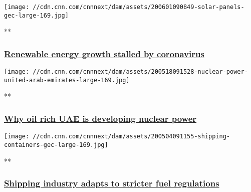 \href{/videos/business/2020/06/01/renewable-energy-solar-wind-coronavirus-gec.cnn-business/video/playlists/business-global-energy-challenge/}{}

\texttt{[image: //cdn.cnn.com/cnnnext/dam/assets/200601090849-solar-panels-gec-large-169.jpg]}

**

\hypertarget{renewable-energy-growth-stalled-by-coronavirus}{%
\subsubsection{\texorpdfstring{\href{/videos/business/2020/06/01/renewable-energy-solar-wind-coronavirus-gec.cnn-business/video/playlists/business-global-energy-challenge/}{Renewable
energy growth stalled by
coronavirus}}{Renewable energy growth stalled by coronavirus}}\label{renewable-energy-growth-stalled-by-coronavirus}}

\href{/videos/business/2020/05/18/nuclear-power-energy-united-arab-emirates.cnn-business/video/playlists/business-global-energy-challenge/}{}

\texttt{[image: //cdn.cnn.com/cnnnext/dam/assets/200518091528-nuclear-power-united-arab-emirates-large-169.jpg]}

**

\hypertarget{why-oil-rich-uae-is-developing-nuclear-power}{%
\subsubsection{\texorpdfstring{\href{/videos/business/2020/05/18/nuclear-power-energy-united-arab-emirates.cnn-business/video/playlists/business-global-energy-challenge/}{Why
oil rich UAE is developing nuclear
power}}{Why oil rich UAE is developing nuclear power}}\label{why-oil-rich-uae-is-developing-nuclear-power}}

\href{/videos/business/2020/05/04/shipping-fuel-standards-environment-gec.cnn-business/video/playlists/business-global-energy-challenge/}{}

\texttt{[image: //cdn.cnn.com/cnnnext/dam/assets/200504091155-shipping-containers-gec-large-169.jpg]}

**

\hypertarget{shipping-industry-adapts-to-stricter-fuel-regulations-}{%
\subsubsection{\texorpdfstring{\href{/videos/business/2020/05/04/shipping-fuel-standards-environment-gec.cnn-business/video/playlists/business-global-energy-challenge/}{Shipping
industry adapts to stricter fuel regulations
}}{Shipping industry adapts to stricter fuel regulations }}\label{shipping-industry-adapts-to-stricter-fuel-regulations-}}

